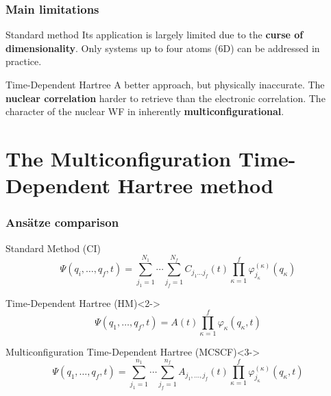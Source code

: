 \documentclass{beamer}
\begin{document}
\begin{frame}
  \frametitle{Main limitations}
  \begin{exampleblock}{Standard method}
    \justifying
    Its application is largely limited due to the \textbf{curse of dimensionality}. Only systems up to four atoms (6D) can be addressed in practice.
  \end{exampleblock}
  \begin{block}{Time-Dependent Hartree}
    A better approach, but physically inaccurate. The \textbf{nuclear correlation} harder to retrieve
    than the electronic correlation. The character of the nuclear WF in inherently \textbf{multiconfigurational}. 
  \end{block}
\end{frame}

\section{The Multiconfiguration Time-Dependent Hartree method}
\label{mctdh}

\begin{frame}
  \frametitle{Ansätze comparison}
  \vspace{-.3cm}
  \begin{block}{Standard Method (CI)}
    \begin{equation}
      \Psi(q_i,\ldots, q_f, t) = \sum_{j_1=1}^{N_1}\cdots\sum_{j_f=1}^{N_f} C_{j_1\ldots j_f}(t)\prod_{\kappa=1}^f\varphi^{(\kappa)}_{j_{\kappa}}(q_{\kappa})
    \end{equation}
  \end{block}
  \begin{exampleblock}{Time-Dependent Hartree (HM)}<2->
    \begin{equation}
      \Psi(q_1,\ldots, q_f, t) = A(t)\prod^f_{\kappa=1}\varphi_{\kappa}(q_{\kappa}, t)
    \end{equation}
  \end{exampleblock}

  \begin{alertblock}{Multiconfiguration Time-Dependent Hartree (MCSCF)}<3->
    \begin{equation}
      \Psi(q_1,\ldots, q_f, t) = \sum^{n_1}_{j_1=1}\cdots\sum^{n_f}_{j_f=1}A_{j_1,\ldots,j_f}(t)\prod^{f}_{\kappa=1}\varphi^{(\kappa)}_{j_{\kappa}}(q_{\kappa}, t)
      \label{mctdh_antz}
    \end{equation}
  \end{alertblock}
\end{frame}
\end{document}
